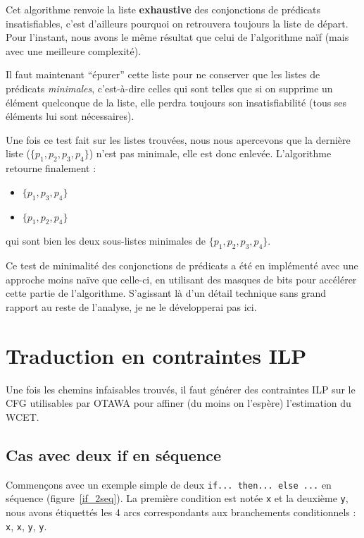 \documentclass[french]{article}
\begin{document}
  Cet algorithme renvoie la liste \textbf{exhaustive} des conjonctions de prédicats insatisfiables, c'est d'ailleurs pourquoi on retrouvera toujours la liste de départ. Pour l'instant, nous avons le même résultat que celui de l'algorithme naïf (mais avec une meilleure complexité).

  Il faut maintenant ``épurer'' cette liste pour ne conserver que les listes de prédicats \textit{minimales}, c'est-à-dire celles qui sont telles que si on supprime un élément quelconque de la liste, elle perdra toujours son insatisfiabilité (tous ses éléments lui sont nécessaires).

  Une fois ce test fait sur les listes trouvées, nous nous apercevons que la dernière liste ($\{p_1, p_2, p_3, p_4\}$) n'est pas minimale, elle est donc enlevée. L'algorithme retourne finalement :

  \begin{itemize}
    \item $\{p_1, p_3, p_4\}$
    \item $\{p_1, p_2, p_4\}$
  \end{itemize}

  qui sont bien les deux sous-listes minimales de $\{p_1, p_2, p_3, p_4\}$.

  Ce test de minimalité des conjonctions de prédicats a été en implémenté avec une approche moins naïve que celle-ci, en utilisant des masques de bits pour accélérer cette partie de l'algorithme. S'agissant là d'un détail technique sans grand rapport au reste de l'analyse, je ne le développerai pas ici.

  \newpage{}
  \section{Traduction en contraintes ILP}
  Une fois les chemins infaisables trouvés, il faut générer des contraintes ILP sur le CFG utilisables par OTAWA pour affiner (du moins on l'espère) l'estimation du WCET.

  \subsection{Cas avec deux if en séquence}
   Commençons avec un exemple simple de deux \texttt{if... then... else ...} en séquence (figure~\ref{if_2seq}). La première condition est notée \texttt{x} et la deuxième \texttt{y}, nous avons étiquettés les 4 arcs correspondants aux branchements conditionnels : \texttt{x}, \texttt{\textlnot x}, \texttt{y}, \texttt{\textlnot y}.
\end{document}
